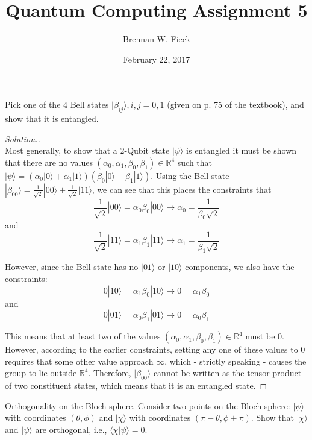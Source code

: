 \documentclass[12pt]{article}
\newenvironment{problem}[2][Problem]{\begin{trivlist}
\item[\hskip \labelsep {\bfseries #1}\hskip \labelsep {\bfseries #2.}]}{\end{trivlist}}
\begin{document}
 
 
\title{Quantum Computing Assignment 5}
\author{Brennan W. Fieck}
\date{February 22, 2017}
\maketitle

\begin{problem}{E1}
Pick one of the 4 Bell states $|\beta_{ij}\rangle,i,j=0,1$ (given on p. 75 of the
textbook), and show that it is entangled.
\end{problem}

\begin{proof}[Solution.]~\\
Most generally, to show that a 2-Qubit state $|\psi\rangle$ is entangled it must be shown
that there are no values $(\alpha_0,\alpha_1,\beta_0,\beta_1)\in\mathbb{R}^4$ such 
that $|\psi\rangle=(\alpha_0|0\rangle+\alpha_1|1\rangle)(\beta_0|0\rangle+\beta_1|1\rangle)$. Using the Bell state
$|\beta_{00}\rangle=\frac{1}{\sqrt{2}}|00\rangle+\frac{1}{\sqrt{2}}|11\rangle$,
we can see that this places the constraints that
$$\frac{1}{\sqrt{2}}|00\rangle=\alpha_0\beta_0|00\rangle\to\alpha_0=\frac{1}{\beta_0\sqrt{2}}$$
\centering and
$$\frac{1}{\sqrt{2}}|11\rangle=\alpha_1\beta_1|11\rangle\to\alpha_1=\frac{1}{\beta_1\sqrt{2}}$$
\raggedright
However, since the Bell state has no $|01\rangle$ or $|10\rangle$ components,
we also have the constraints:
$$0|10\rangle=\alpha_1\beta_0|10\rangle\to0=\alpha_1\beta_0$$
\centering and
$$0|01\rangle=\alpha_0\beta_1|01\rangle\to0=\alpha_0\beta_1$$
\raggedright This means that at least two of the values
$(\alpha_0,\alpha_1,\beta_0,\beta_1)\in\mathbb{R}^4$ must be 0. However,
according to the earlier constraints, setting any one of these values to 0
requires that some other value approach $\infty$, which - strictly speaking
- causes the group to lie outside $\mathbb{R}^4$. Therefore, $|\beta_{00}\rangle$
cannot be written as the tensor product of two constituent states, which
means that it is an entangled state.
\end{proof}

\begin{problem}{E2}
Orthogonality on the Bloch sphere. Consider two points on the Bloch sphere:
$|\psi\rangle$ with coordinates $(\theta,\phi)$ and $|\chi\rangle$ with
coordinates $(\pi-\theta,\phi+\pi)$. Show that $|\chi\rangle$ and $|\psi\rangle$
are orthogonal, i.e., $\langle\chi|\psi\rangle=0$.
\end{problem}
\end{document}
